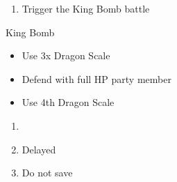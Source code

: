 \begin{enumerate}[resume]
    \item Trigger the King Bomb battle
\end{enumerate}
\begin{battle}[]{King Bomb}
    \begin{itemize}
        \item Use 3x Dragon Scale
        \item Defend with full HP party member
        \item Use 4th Dragon Scale
    \end{itemize}
\end{battle}
\begin{enumerate}[resume]
    \item \cs\
    \item Delayed \cs\
    \item Do not save
\end{enumerate}